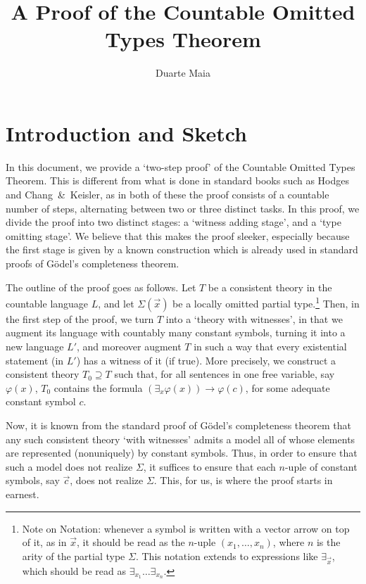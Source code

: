\documentclass{article}
\title{A Proof of the Countable Omitted Types Theorem}
\author{Duarte Maia}
\theoremstyle{nonumberplain}
\begin{document}
\maketitle

\section{Introduction and Sketch}

In this document, we provide a `two-step proof' of the Countable Omitted Types Theorem. This is different from what is done in standard books such as Hodges and Chang~\&~Keisler, as in both of these the proof consists of a countable number of steps, alternating between two or three distinct tasks. In this proof, we divide the proof into two distinct stages: a `witness adding stage', and a `type omitting stage'. We believe that this makes the proof sleeker, especially because the first stage is given by a known construction which is already used in standard proofs of Gödel's completeness theorem.

The outline of the proof goes as follows. Let $T$ be a consistent theory in the countable language $L$, and let $\Sigma(\vec x)$ be a locally omitted partial type.\footnote{Note on Notation: whenever a symbol is written with a vector arrow on top of it, as in $\vec x$, it should be read as the $n$-uple $(x_1, \dots, x_n)$, where $n$ is the arity of the partial type $\Sigma$. This notation extends to expressions like $\exists_{\vec x}$, which should be read as $\exists_{x_1} \dots \exists_{x_n}$.} Then, in the first step of the proof, we turn $T$ into a `theory with witnesses', in that we augment its language with countably many constant symbols, turning it into a new language $L'$, and moreover augment $T$ in such a way that every existential statement (in $L'$) has a witness of it (if true). More precisely, we construct a consistent theory $T_0 \supseteq T$ such that, for all sentences in one free variable, say $\varphi(x)$, $T_0$ contains the formula $(\exists_x \varphi(x)) \rightarrow \varphi(c)$, for some adequate constant symbol $c$.

Now, it is known from the standard proof of Gödel's completeness theorem that any such consistent theory `with witnesses' admits a model all of whose elements are represented (nonuniquely) by constant symbols. Thus, in order to ensure that such a model does not realize $\Sigma$, it suffices to ensure that each $n$-uple of constant symbols, say $\vec c$, does not realize $\Sigma$. This, for us, is where the proof starts in earnest.
\end{document}
